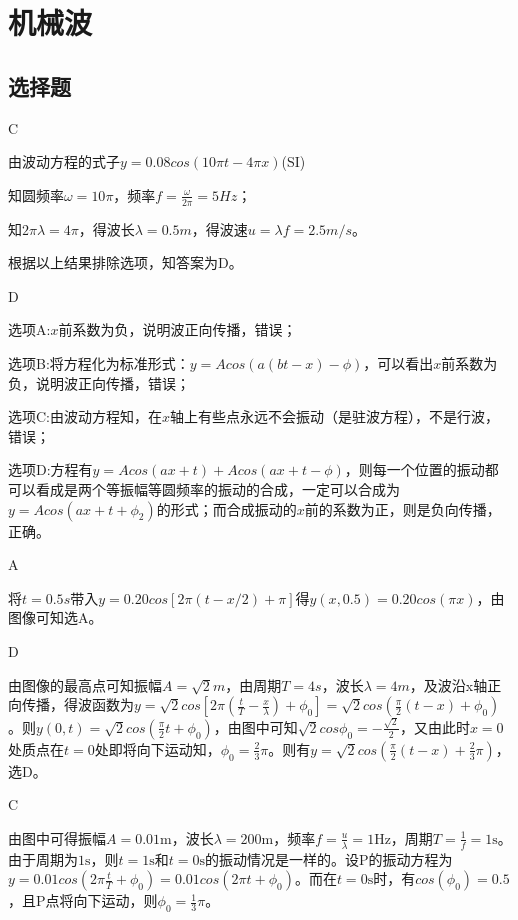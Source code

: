 \chapter{机械波}

\section{选择题}

\exercise C

\solve 由波动方程的式子$y=0.08cos(10\pi t-4\pi x)$(SI)

知圆频率$\omega=10\pi$，频率$f=\frac{\omega}{2 \pi}=5Hz$；

知$2\pi\lambda=4\pi$，得波长$\lambda=0.5m$，得波速$u=\lambda f=2.5m/s$。

根据以上结果排除选项，知答案为D。

\exercise D

\solve 

选项A:$x$前系数为负，说明波正向传播，错误；

选项B:将方程化为标准形式：$y=Acos(a(bt-x)-\phi)$，可以看出$x$前系数为负，说明波正向传播，错误；

选项C:由波动方程知，在$x$轴上有些点永远不会振动（是驻波方程），不是行波，错误；

选项D:方程有$y=Acos(ax+t)+Acos(ax+t-\phi)$，则每一个位置的振动都可以看成是两个等振幅等圆频率的振动的合成，一定可以合成为$y=Acos(ax+t+\phi_2)$的形式；而合成振动的$x$前的系数为正，则是负向传播，正确。

\exercise A

\solve 将$t=0.5s$带入$y=0.20cos[2\pi (t-x/2)+\pi]$得$y(x,0.5)=0.20cos(\pi x)$，由图像可知选A。

\exercise D

\solve 由图像的最高点可知振幅$A=\sqrt{2}m$，由周期$T=4s$，波长$\lambda=4m$，及波沿x轴正向传播，得波函数为$y=\sqrt{2}cos[2\pi({\frac{t}{T}-\frac{x}{\lambda}})+\phi_0]=\sqrt{2}cos(\frac{\pi}{2}(t-x)+\phi_0)$。则$y(0,t)=\sqrt{2}cos(\frac{\pi}{2}t+\phi_0)$，由图中可知$\sqrt{2}cos\phi_0=-\frac{\sqrt{2}}{2}$，又由此时$x=0$处质点在$t=0$处即将向下运动知，$\phi_0=\frac{2}{3}\pi$。则有$y=\sqrt{2}cos(\frac{\pi}{2}(t-x)+\frac{2}{3}\pi)$，选D。

\exercise C

\solve  由图中可得振幅$A=0.01$m，波长$\lambda=200$m，频率$f=\frac{u}{\lambda}=1$Hz，周期$T=\frac{1}{f}=1\mathrm{s}$。由于周期为$1\mathrm{s}$，则$t=1\mathrm{s}$和$t=0\mathrm{s}$的振动情况是一样的。设P的振动方程为$y=0.01cos(2\pi\frac{t}{T}+\phi_0)=0.01cos(2\pi t+\phi_0)$。而在$t=0\mathrm{s}$时，有$cos(\phi_0)=0.5$，且P点将向下运动，则$\phi_0=\frac{1}{3}\pi$。

